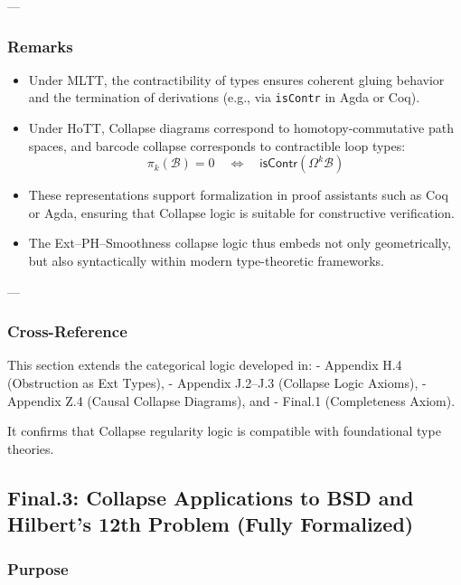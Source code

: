 \documentclass[11pt]{article}
\begin{document}
\begin{axiom}
\begin{axiom}
{{---

\subsubsection*{Remarks}

\begin{itemize}
  \item Under MLTT, the contractibility of types ensures coherent gluing behavior and the termination of derivations  
  (e.g., via \texttt{isContr} in Agda or Coq).

  \item Under HoTT, Collapse diagrams correspond to homotopy-commutative path spaces,  
  and barcode collapse corresponds to contractible loop types:  
  \[
  \pi_k(\mathcal{B}) = 0 \quad \Leftrightarrow \quad \mathsf{isContr}(\Omega^k \mathcal{B})
  \]

  \item These representations support formalization in proof assistants such as Coq or Agda,  
  ensuring that Collapse logic is suitable for constructive verification.

  \item The Ext–PH–Smoothness collapse logic thus embeds not only geometrically,  
  but also syntactically within modern type-theoretic frameworks.
\end{itemize}

---

\subsubsection*{Cross-Reference}

This section extends the categorical logic developed in:
- Appendix H.4 (Obstruction as Ext Types),
- Appendix J.2–J.3 (Collapse Logic Axioms),
- Appendix Z.4 (Causal Collapse Diagrams), and
- Final.1 (Completeness Axiom).

It confirms that Collapse regularity logic is compatible with foundational type theories.




\subsection*{Final.3: Collapse Applications to BSD and Hilbert’s 12th Problem (Fully Formalized)}

\subsubsection*{Purpose}

}}
\end{axiom}
\end{axiom}
\end{document}
